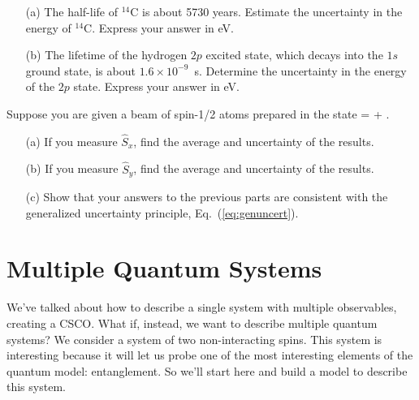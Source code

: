\begin{exercise}

\begin{enumerate}
\item[(a)]  The half-life of $^{14}$C  is about 5730 years.  Estimate the uncertainty in the energy of  $^{14}$C.  Express your answer in eV.
\item[(b)]   The lifetime of the hydrogen $2p$ excited state, which decays into the $1s$ ground state,  is about $1.6 \times 10^{-9}$~s.   Determine the uncertainty in the energy of the $2p$ state.  Express your answer in eV.
\end{enumerate}
\end{exercise}

\begin{exercise}
 Suppose you are given a beam of spin-1/2 atoms prepared in the state 
%
\beq
\ket{\Psi} =  + \I{}.
\eeq
%
\begin{enumerate}
\item[(a)] If you measure $\hat{S}_{x}$, find the average and uncertainty of the results.
\item[(b)] If you measure $\hat{S}_{y}$, find the average and uncertainty of the results.
\item[(c)]  Show that your answers to the previous parts are consistent with the generalized uncertainty principle, Eq.~(\ref{eq:genuncert}).

\end{enumerate}
\end{exercise}


\chapter{Multiple Quantum Systems}
\label{ch:mqs}
We've talked about how to describe a single system with multiple observables, creating a CSCO. What if, instead, we want to describe multiple quantum systems? We consider a system of two non-interacting spins. This system is interesting because it will let us probe one of the most interesting elements of the quantum model: entanglement. So we'll start here and build a model to describe this system.

